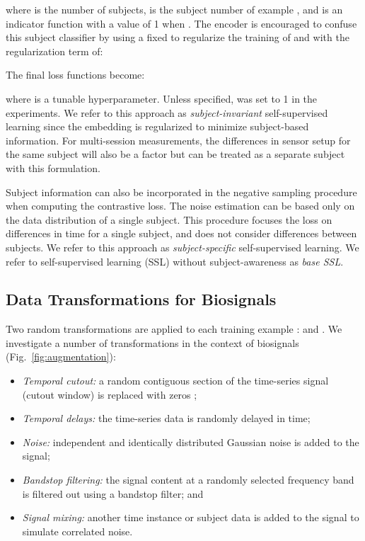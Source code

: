 \documentclass{article}
\begin{document}
where  is the number of subjects,  is the subject number of
example , and  is an indicator function with a value
of 1 when . The encoder  is encouraged to confuse this subject
classifier by using a fixed  to regularize the training of 
and  with the regularization term of:

The final loss functions become:

where  is a tunable hyperparameter. Unless specified,  was set
to 1 in the experiments. We refer to this approach as \textit{subject-invariant}
self-supervised learning since the embedding is regularized to minimize
subject-based information. For multi-session measurements, the differences in
sensor setup for the same subject will also be a factor but can be treated as a
separate subject with this formulation.

Subject information can also be incorporated in the negative sampling procedure
when computing the contrastive loss. The noise estimation can be based only on
the data distribution of a single subject. This procedure focuses the loss on
differences in time for a single subject, and does not consider differences
between subjects. We refer to this approach as \textit{subject-specific}
self-supervised learning. We refer to self-supervised learning (SSL) without
subject-awareness as \textit{base SSL}.

\subsection{Data Transformations for Biosignals}

Two random transformations are applied to each training example :  and . We investigate a number of transformations
in the context of biosignals (Fig.~\ref{fig:augmentation}):
\begin{itemize}
  \setlength{\itemsep}{0pt}
  \item \textit{Temporal cutout:} a random contiguous section of the time-series
  signal (cutout window) is replaced with zeros \cite{devries_improved_2017};
  \item \textit{Temporal delays:} the time-series data is randomly delayed in time;
  \item \textit{Noise:} independent and identically distributed Gaussian noise is added to the signal;
  \item \textit{Bandstop filtering:} the signal content at a randomly selected
  frequency band is filtered out using a bandstop filter; and
  \item \textit{Signal mixing:} another time instance or subject data is added to the signal to simulate correlated noise.
\end{itemize}
\end{document}
